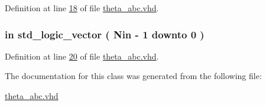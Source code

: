 Definition at line \hyperlink{theta__abc_8vhd_source_l00018}{18} of file \hyperlink{theta__abc_8vhd_source}{theta\+\_\+abc.\+vhd}.

\hypertarget{classtheta__abc_aa0a6389197d6e4203cf6b365fbe2e2d1}{}
\subsubsection[{theta\+\_\+in}]{ {\bfseries \textcolor{keywordflow}{in}\textcolor{vhdlchar}{ }} {\bfseries \textcolor{comment}{std\+\_\+logic\+\_\+vector}\textcolor{vhdlchar}{ }\textcolor{vhdlchar}{(}\textcolor{vhdlchar}{ }\textcolor{vhdlchar}{ }\textcolor{vhdlchar}{ }\textcolor{vhdlchar}{ }{\bfseries {\bf Nin}} \textcolor{vhdlchar}{-\/}\textcolor{vhdlchar}{ } \textcolor{vhdldigit}{1} \textcolor{vhdlchar}{ }\textcolor{keywordflow}{downto}\textcolor{vhdlchar}{ }\textcolor{vhdlchar}{ } \textcolor{vhdldigit}{0} \textcolor{vhdlchar}{ }\textcolor{vhdlchar}{)}\textcolor{vhdlchar}{ }} \hspace{0.3cm}{\ttfamily [Port]}}\label{classtheta__abc_aa0a6389197d6e4203cf6b365fbe2e2d1}


Definition at line \hyperlink{theta__abc_8vhd_source_l00020}{20} of file \hyperlink{theta__abc_8vhd_source}{theta\+\_\+abc.\+vhd}.



The documentation for this class was generated from the following file\+:\begin{DoxyCompactItemize}
\item 
\hyperlink{theta__abc_8vhd}{theta\+\_\+abc.\+vhd}\end{DoxyCompactItemize}
